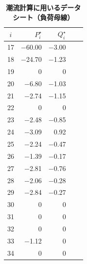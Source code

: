 \documentclass[tombow,dvipdfmx]{corona-a5-1.1}
\begin{document}
 
\begin{table}[h]
\medskip
\caption{\textbf{潮流計算に用いるデータシート（負荷母線）}} \label{table:ieee68datal}
 \centering
  {
  \begin{minipage}{0.32\linewidth}
    \centering
  \begin{tabular}{crrcc}
   \hline
$i$ & $P_i^{\star}$  &  $Q_i^{\star}$ \\
   \hline \hline
\multicolumn{1}{c}{17}  & \multicolumn{1}{r}{$-$60.00} & \multicolumn{1}{r}{$-$3.00} \\
\multicolumn{1}{c}{18}  & \multicolumn{1}{r}{$-$24.70} & \multicolumn{1}{r}{$-$1.23}  \\
\multicolumn{1}{c}{19}  & \multicolumn{1}{r}{0} & \multicolumn{1}{r}{0}  \\
\multicolumn{1}{c}{20}  & \multicolumn{1}{r}{$-$6.80} & \multicolumn{1}{r}{$-$1.03}  \\
\multicolumn{1}{c}{21}  & \multicolumn{1}{r}{$-$2.74} & \multicolumn{1}{r}{$-$1.15}  \\
\multicolumn{1}{c}{22}  & \multicolumn{1}{r}{0} & \multicolumn{1}{r}{0}  \\
\multicolumn{1}{c}{23}  & \multicolumn{1}{r}{$-$2.48} & \multicolumn{1}{r}{$-$0.85} \\
\multicolumn{1}{c}{24}  & \multicolumn{1}{r}{$-$3.09} & \multicolumn{1}{r}{0.92} \\
\multicolumn{1}{c}{25}  & \multicolumn{1}{r}{$-$2.24} & \multicolumn{1}{r}{$-$0.47} \\
\multicolumn{1}{c}{26}  & \multicolumn{1}{r}{$-$1.39} & \multicolumn{1}{r}{$-$0.17}  \\
\multicolumn{1}{c}{27}  & \multicolumn{1}{r}{$-$2.81} & \multicolumn{1}{r}{$-$0.76} \\
\multicolumn{1}{c}{28}  & \multicolumn{1}{r}{$-$2.06} & \multicolumn{1}{r}{$-$0.28}  \\
\multicolumn{1}{c}{29}  & \multicolumn{1}{r}{$-$2.84} & \multicolumn{1}{r}{$-$0.27}  \\
\multicolumn{1}{c}{30}  & \multicolumn{1}{r}{0} & \multicolumn{1}{r}{0} \\
\multicolumn{1}{c}{31}  & \multicolumn{1}{r}{0} & \multicolumn{1}{r}{0} \\
\multicolumn{1}{c}{32}  & \multicolumn{1}{r}{0} & \multicolumn{1}{r}{0} \\
\multicolumn{1}{c}{33}  & \multicolumn{1}{r}{$-$1.12} & \multicolumn{1}{r}{0} \\
\multicolumn{1}{c}{34}  & \multicolumn{1}{r}{0} & \multicolumn{1}{r}{0} \\

\end{tabular}
\end{minipage}}
\end{table}
\end{document}
